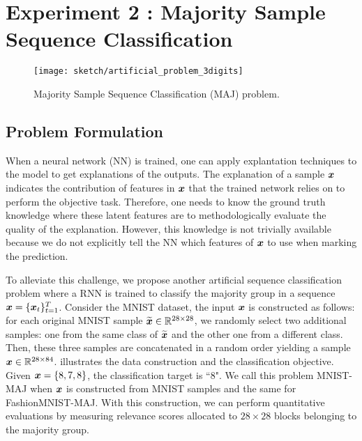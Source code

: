 \section{Experiment 2 : Majority Sample Sequence Classification} \label{sec:exp2}
   
 \begin{figure}[!htb]
\centering
\texttt{[image: sketch/artificial\_problem\_3digits]}
\caption{Majority Sample Sequence Classification (MAJ) problem.} 
\label{fig:artificial_problem_3digits}
\end{figure}

\subsection{Problem Formulation} \label{sec:exp2_prob_formulate}
When a neural network (NN) is trained, one can apply explantation techniques to the model to get explanations of the outputs.  The explanation of a sample $\boldsymbol{x}$ indicates the contribution of features in $\boldsymbol{x}$ that the trained network relies on to perform the objective task.  Therefore, one needs to know the ground truth knowledge where these latent features are to methodologically evaluate the quality of the explanation.  However, this knowledge is not trivially available because we do not explicitly tell the NN which features of $\boldsymbol{x}$ to use when marking the prediction.


To alleviate this challenge, we propose another artificial sequence classification problem where a RNN is trained to classify  the majority group in a sequence $\boldsymbol{x} = \{ \boldsymbol{x}_t \}_{t=1}^{T}$. Consider  the MNIST dataset, the input $\boldsymbol{x}$ is constructed as follows: for each original MNIST sample $\widetilde{\boldsymbol{x}} \in \mathbb{R}^{28 \times 28}$, we randomly select two additional samples: one from the same class of $\widetilde{\boldsymbol{x}}$ and the other one from a different class. Then, these three samples are concatenated in a random order yielding a sample $\boldsymbol{x} \in \mathbb{R}^{28 \times 84}$.  \addfigure{\ref{fig:artificial_problem_3digits}} illustrates the data construction and the classification objective. Given $\boldsymbol{x} = \{ 8, 7, 8\}$, the classification target is ``8".  We call this problem MNIST-MAJ when $\boldsymbol{x}$ is constructed from MNIST samples and the same for FashionMNIST-MAJ. With this construction, we can perform quantitative evaluations by measuring relevance scores allocated to $28\times28$ blocks belonging to the majority group.
%



